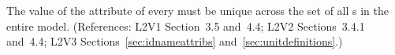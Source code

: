 The value of the  attribute of every \UnitDefinition must be
unique across the set of all \UnitDefinition{}s in the entire
model.  (References: L2V1 Section~3.5 and~4.4; L2V2 Sections~3.4.1 and~4.4;
L2V3 Sections~\ref{sec:idnameattribs} and~\ref{sec:unitdefinitions}.)
